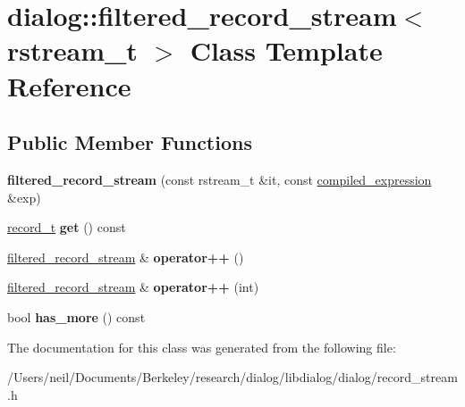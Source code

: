 \hypertarget{classdialog_1_1filtered__record__stream}{}\section{dialog\+:\+:filtered\+\_\+record\+\_\+stream$<$ rstream\+\_\+t $>$ Class Template Reference}
\label{classdialog_1_1filtered__record__stream}
\subsection*{Public Member Functions}
\begin{DoxyCompactItemize}
\item 
\mbox{\label{classdialog_1_1filtered__record__stream_a6138d5f3256d115441fd683e4e57b282}} 
{\bfseries filtered\+\_\+record\+\_\+stream} (const rstream\+\_\+t \&it, const \hyperlink{structdialog_1_1compiled__expression}{compiled\+\_\+expression} \&exp)
\item 
\mbox{\label{classdialog_1_1filtered__record__stream_a72064108caaec2c7b34846f6fc6e7d19}} 
\hyperlink{structdialog_1_1record__t}{record\+\_\+t} {\bfseries get} () const
\item 
\mbox{\label{classdialog_1_1filtered__record__stream_a3a5e9a8e6a0e95bc43927533e5eb8a42}} 
\hyperlink{classdialog_1_1filtered__record__stream}{filtered\+\_\+record\+\_\+stream} \& {\bfseries operator++} ()
\item 
\mbox{\label{classdialog_1_1filtered__record__stream_aed238d4263a295a2f40f774ba75b6b7d}} 
\hyperlink{classdialog_1_1filtered__record__stream}{filtered\+\_\+record\+\_\+stream} \& {\bfseries operator++} (int)
\item 
\mbox{\label{classdialog_1_1filtered__record__stream_aa2397b51950ad0c0eb8e4da075d2c4cd}} 
bool {\bfseries has\+\_\+more} () const
\end{DoxyCompactItemize}


The documentation for this class was generated from the following file\+:\begin{DoxyCompactItemize}
\item 
/\+Users/neil/\+Documents/\+Berkeley/research/dialog/libdialog/dialog/record\+\_\+stream.\+h\end{DoxyCompactItemize}
